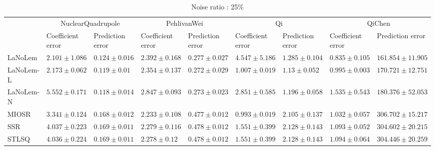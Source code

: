 \begin{table*}
\centering
\caption{Noise ratio : 25\%}
\label{}
\scalebox{0.7}
{
\begin{tabular}{lllllllll}
\toprule
 & \multicolumn{2}{c}{NuclearQuadrupole} & \multicolumn{2}{c}{PehlivanWei} & \multicolumn{2}{c}{Qi} & \multicolumn{2}{c}{QiChen} \\
 & Coefficient error & Prediction error & Coefficient error & Prediction error & Coefficient error & Prediction error & Coefficient error & Prediction error \\
\midrule
LaNoLem & $\mathbf{2.101}\pm 1.086$ & $0.124\pm 0.016$ & $2.392\pm 0.168$ & $0.277\pm 0.027$ & $4.547\pm 5.186$ & $1.285\pm 0.104$ & $\mathbf{0.835}\pm 0.105$ & $\mathbf{161.854}\pm 11.905$ \\
LaNoLem-L & $2.173\pm 0.062$ & $0.119\pm 0.01$ & $2.354\pm 0.137$ & $\mathbf{0.272}\pm 0.029$ & $1.007\pm 0.019$ & $\mathbf{1.13}\pm 0.052$ & $0.995\pm 0.003$ & $170.721\pm 12.751$ \\
LaNoLem-N & $5.552\pm 0.171$ & $\mathbf{0.118}\pm 0.014$ & $2.847\pm 0.093$ & $0.273\pm 0.023$ & $2.851\pm 0.585$ & $1.196\pm 0.058$ & $1.535\pm 0.543$ & $180.376\pm 52.053$ \\
MIOSR & $3.341\pm 0.124$ & $0.168\pm 0.012$ & $\mathbf{2.233}\pm 0.108$ & $0.477\pm 0.012$ & $\mathbf{0.993}\pm 0.019$ & $2.105\pm 0.137$ & $1.032\pm 0.057$ & $306.702\pm 15.217$ \\
SSR & $4.037\pm 0.223$ & $0.169\pm 0.011$ & $2.279\pm 0.116$ & $0.478\pm 0.012$ & $1.551\pm 0.399$ & $2.128\pm 0.143$ & $1.093\pm 0.052$ & $304.602\pm 20.215$ \\
STLSQ & $4.036\pm 0.224$ & $0.169\pm 0.011$ & $2.278\pm 0.12$ & $0.478\pm 0.012$ & $1.551\pm 0.399$ & $2.128\pm 0.143$ & $1.094\pm 0.064$ & $304.446\pm 20.259$ \\

\midrule


\end{tabular}}
\end{table*}
